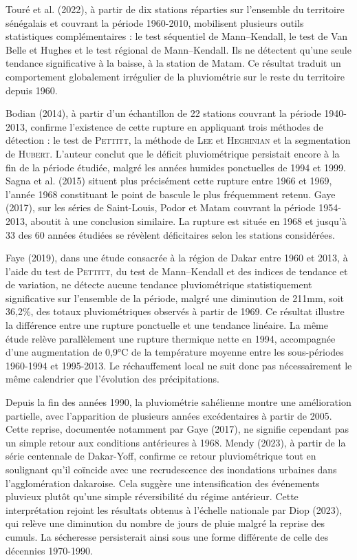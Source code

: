 Touré et al. (2022), à partir de dix stations réparties sur l'ensemble du territoire sénégalais et couvrant la période 1960-2010, mobilisent plusieurs outils statistiques complémentaires : le test séquentiel de Mann--Kendall, le test de Van Belle et Hughes et le test régional de Mann--Kendall. Ils ne détectent qu'une seule tendance significative à la baisse, à la station de Matam. Ce résultat traduit un comportement globalement irrégulier de la pluviométrie sur le reste du territoire depuis 1960.

Bodian (2014), à partir d'un échantillon de 22 stations couvrant la période 1940-2013, confirme l'existence de cette rupture en appliquant trois méthodes de détection : le test de \textsc{Pettitt}, la méthode de \textsc{Lee} et \textsc{Heghinian} et la segmentation de \textsc{Hubert}. L'auteur conclut que le déficit pluviométrique persistait encore à la fin de la période étudiée, malgré les années humides ponctuelles de 1994 et 1999. Sagna et al. (2015) situent plus précisément cette rupture entre 1966 et 1969, l'année 1968 constituant le point de bascule le plus fréquemment retenu. Gaye (2017), sur les séries de Saint-Louis, Podor et Matam couvrant la période 1954-2013, aboutit à une conclusion similaire. La rupture est située en 1968 et jusqu'à 33 des 60 années étudiées se révèlent déficitaires selon les stations considérées.

Faye (2019), dans une étude consacrée à la région de Dakar entre 1960 et 2013, à l’aide du test de \textsc{Pettitt}, du test de Mann–Kendall et des indices de tendance et de variation, ne détecte aucune tendance pluviométrique statistiquement significative sur l’ensemble de la période, malgré une diminution de 211mm, soit 36,2\%, des totaux pluviométriques observés à partir de 1969. Ce résultat illustre la différence entre une rupture ponctuelle et une tendance linéaire. La même étude relève parallèlement une rupture thermique nette en 1994, accompagnée d'une augmentation de 0,9°C de la température moyenne entre les sous-périodes 1960-1994 et 1995-2013. Le réchauffement local ne suit donc pas nécessairement le même calendrier que l'évolution des précipitations.

Depuis la fin des années 1990, la pluviométrie sahélienne montre une amélioration partielle, avec l'apparition de plusieurs années excédentaires à partir de 2005. Cette reprise, documentée notamment par Gaye (2017), ne signifie cependant pas un simple retour aux conditions antérieures à 1968. Mendy (2023), à partir de la série centennale de Dakar-Yoff, confirme ce retour pluviométrique tout en soulignant qu'il coïncide avec une recrudescence des inondations urbaines dans l'agglomération dakaroise. Cela suggère une intensification des événements pluvieux plutôt qu'une simple réversibilité du régime antérieur. Cette interprétation rejoint les résultats obtenus à l'échelle nationale par Diop (2023), qui relève une diminution du nombre de jours de pluie malgré la reprise des cumuls. La sécheresse persisterait ainsi sous une forme différente de celle des décennies 1970-1990.

